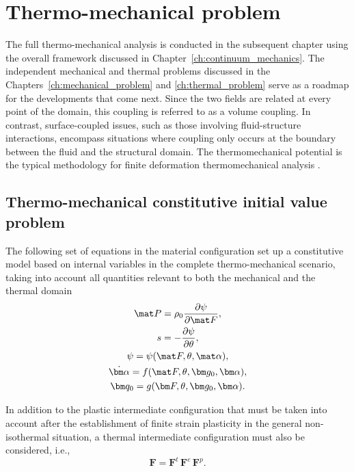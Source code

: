 \chapter{Thermo-mechanical problem}
\label{ch:thermo_mechanical_problem}

The full thermo-mechanical analysis is conducted in the subsequent chapter using the overall framework discussed in Chapter~\ref{ch:continuum_mechanics}.
The independent mechanical and thermal problems discussed in the Chapters~\ref{ch:mechanical_problem} and \ref{ch:thermal_problem} serve as a roadmap for the developments that come next.
Since the two fields are related at every point of the domain, this coupling is referred to as a volume coupling.
In contrast, surface-coupled issues, such as those involving fluid-structure interactions, encompass situations where coupling only occurs at the boundary between the fluid and the structural domain.
The thermomechanical potential is the typical methodology for finite deformation thermomechanical analysis \citep{danowski_computational_2014}.



\section{Thermo-mechanical constitutive initial value problem}

The following set of equations in the material configuration set up a constitutive model based on internal variables in the complete thermo-mechanical scenario, taking into account all quantities relevant to both the mechanical and the thermal domain
    \begin{gather}
        \mat P = \rho_0 \frac{\partial \psi}{\partial \mat F},\\
        s = - \frac{\partial \psi}{\partial \theta},\\
        \psi = \psi(\mat F,\theta, \mat \alpha),\label{eq:thermo_mech_helmholtz_free_energy}\\
        \dot{\bm \alpha} = f(\mat F, \theta, \bm g_0,\bm \alpha),\\
        \bm q_0 = g(\bm F, \theta, \bm g_0, \bm \alpha).
    \end{gather}

In addition to the plastic intermediate configuration that must be taken into account after the establishment of finite strain plasticity in the general non-isothermal situation, a thermal intermediate configuration must also be considered, i.e.,
\begin{equation}
  \bm F = \bm F^t\,\bm F^e\,\bm F^p.
\end{equation}

